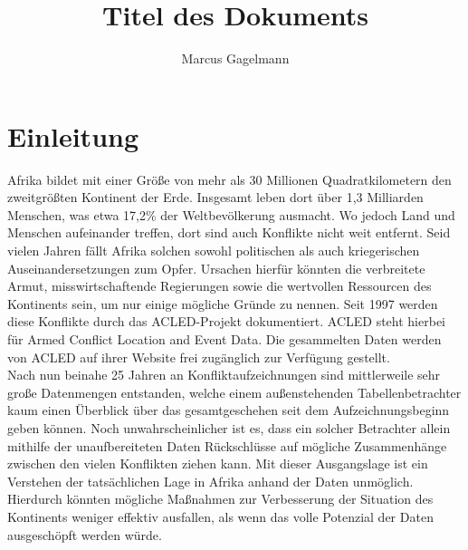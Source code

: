 \documentclass[usegeometry=true]{scrartcl}
\begin{document}
\subject{Projektbericht zum Modul Information Retrieval und Visualisierung Sommersemester 2021}
\title{Titel des Dokuments}
\author{Marcus Gagelmann}%
\maketitle%

\section{Einleitung}
Afrika bildet mit einer Größe von mehr als 30 Millionen Quadratkilometern den zweitgrößten Kontinent der Erde. Insgesamt leben dort über 1,3 Milliarden Menschen, was etwa 17,2\% der Weltbevölkerung ausmacht. Wo jedoch Land und Menschen aufeinander treffen, dort sind auch Konflikte nicht weit entfernt. Seid vielen Jahren fällt Afrika solchen sowohl politischen als auch kriegerischen Auseinandersetzungen zum Opfer. Ursachen hierfür könnten die verbreitete Armut, misswirtschaftende Regierungen sowie die wertvollen Ressourcen des Kontinents sein, um nur einige mögliche Gründe zu nennen. Seit 1997 werden diese Konflikte durch das ACLED-Projekt dokumentiert. ACLED steht hierbei für \glqq Armed Conflict Location and Event Data\grqq{}. Die gesammelten Daten werden von ACLED auf ihrer Website \cite{acled-export} frei zugänglich zur Verfügung gestellt.\\

Nach nun beinahe 25 Jahren an Konfliktaufzeichnungen sind mittlerweile sehr große Datenmengen entstanden, welche einem außenstehenden Tabellenbetrachter kaum einen Überblick über das gesamtgeschehen seit dem Aufzeichnungsbeginn geben können. Noch unwahrscheinlicher ist es, dass ein solcher Betrachter allein mithilfe der unaufbereiteten Daten Rückschlüsse auf mögliche Zusammenhänge zwischen den vielen Konflikten ziehen kann. Mit dieser Ausgangslage ist ein Verstehen der tatsächlichen Lage in Afrika anhand der Daten unmöglich. Hierdurch könnten mögliche Maßnahmen zur Verbesserung der Situation des Kontinents weniger effektiv ausfallen, als wenn das volle Potenzial der Daten ausgeschöpft werden würde.\\
\end{document}
